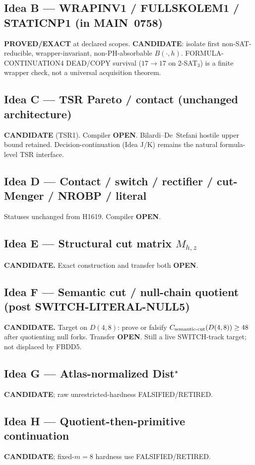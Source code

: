 \documentclass[11pt]{article}
\begin{document}
\subsection*{Idea B --- WRAPINV1 / FULLSKOLEM1 / STATICNP1 (in MAIN~0758)}
\textbf{PROVED/EXACT} at declared scopes.
\textbf{CANDIDATE}: isolate first non-SAT-reducible, wrapper-invariant, non-PH-absorbable $B(\cdot,h)$.
FORMULA-CONTINUATION4 DEAD/COPY survival ($17\to17$ on 2-SAT$_3$) is a finite wrapper check,
not a universal acquisition theorem.

\subsection*{Idea C --- TSR Pareto / contact (unchanged architecture)}
\textbf{CANDIDATE} (TSR1). Compiler \textbf{OPEN}. Bilardi--De~Stefani hostile upper bound retained.
Decision-continuation (Idea J/K) remains the natural formula-level TSR interface.

\subsection*{Idea D --- Contact / switch / rectifier / cut-Menger / NROBP / literal}
Statuses unchanged from H1619. Compiler \textbf{OPEN}.

\subsection*{Idea E --- Structural cut matrix $M_{h,z}$}
\textbf{CANDIDATE.} Exact construction and transfer both \textbf{OPEN}.

\subsection*{Idea F --- Semantic cut / null-chain quotient (post SWITCH-LITERAL-NULL5)}
\textbf{CANDIDATE.} Target on $D(4,8)$: prove or falsify
$C_{\rm semantic\textrm{-}cut}(D(4,8))\ge 48$ after quotienting null forks. Transfer \textbf{OPEN}.
Still a live SWITCH-track target; not displaced by FBDD5.

\subsection*{Idea G --- Atlas-normalized Dist$^\star$}
\textbf{CANDIDATE}; raw unrestricted-hardness FALSIFIED/RETIRED.

\subsection*{Idea H --- Quotient-then-primitive continuation}
\textbf{CANDIDATE}; fixed-$m=8$ hardness use FALSIFIED/RETIRED.
\end{document}
